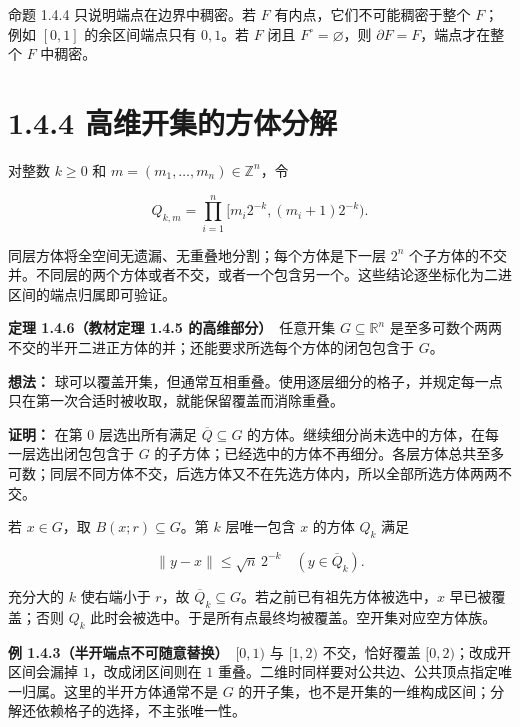 \documentclass[11pt,a4paper]{article}
\begin{document}
命题 1.4.4 只说明端点在边界中稠密。若 \(F\) 有内点，它们不可能稠密于整个
\(F\)；例如 \([0,1]\) 的余区间端点只有 \(0,1\)。若 \(F\) 闭且
\(F^\circ=\varnothing\)，则 \(\partial F=F\)，端点才在整个 \(F\)
中稠密。

\section[\S{}1.4.4
高维开集的方体分解]{1.4.4
高维开集的方体分解}\label{ux9ad8ux7ef4ux5f00ux96c6ux7684ux65b9ux4f53ux5206ux89e3}

对整数 \(k\geq0\) 和 \(m=(m_1,\ldots,m_n)\in\mathbb Z^n\)，令

\begin{equation*}
Q_{k,m}=\prod_{i=1}^n[m_i2^{-k},(m_i+1)2^{-k}).
\tag{1.4.3}
\end{equation*}

同层方体将全空间无遗漏、无重叠地分割；每个方体是下一层 \(2^n\)
个子方体的不交并。不同层的两个方体或者不交，或者一个包含另一个。这些结论逐坐标化为二进区间的端点归属即可验证。

\textbf{定理 1.4.6（教材定理 1.4.5 的高维部分）}　任意开集
\(G\subseteq\mathbb R^n\)
是至多可数个两两不交的半开二进正方体的并；还能要求所选每个方体的闭包包含于
\(G\)。

\textbf{想法：}
球可以覆盖开集，但通常互相重叠。使用逐层细分的格子，并规定每一点只在第一次合适时被收取，就能保留覆盖而消除重叠。

\textbf{证明：} 在第 \(0\) 层选出所有满足 \(\overline Q\subseteq G\)
的方体。继续细分尚未选中的方体，在每一层选出闭包包含于 \(G\)
的子方体；已经选中的方体不再细分。各层方体总共至多可数；同层不同方体不交，后选方体又不在先选方体内，所以全部所选方体两两不交。

若 \(x\in G\)，取 \(B(x;r)\subseteq G\)。第 \(k\) 层唯一包含 \(x\)
的方体 \(Q_k\) 满足

\begin{equation*}
\|y-x\|\leq\sqrt n\,2^{-k}\quad(y\in\overline Q_k).
\tag{1.4.4}
\end{equation*}

充分大的 \(k\) 使右端小于 \(r\)，故
\(\overline Q_k\subseteq G\)。若之前已有祖先方体被选中，\(x\)
早已被覆盖；否则 \(Q_k\)
此时会被选中。于是所有点最终均被覆盖。空开集对应空方体族。

\textbf{例 1.4.3（半开端点不可随意替换）}　\([0,1)\) 与 \([1,2)\)
不交，恰好覆盖 \([0,2)\)；改成开区间会漏掉 \(1\)，改成闭区间则在 \(1\)
重叠。二维时同样要对公共边、公共顶点指定唯一归属。这里的半开方体通常不是
\(G\)
的开子集，也不是开集的一维构成区间；分解还依赖格子的选择，不主张唯一性。
\end{document}
